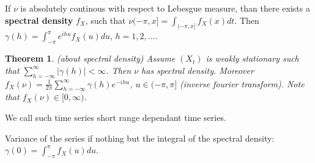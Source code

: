 \documentclass[12pt,a4paper]{amsart}
\theoremstyle{definition} %
\theoremstyle{plain} %
\newtheorem{theorem}[defn]{Theorem}
\begin{document}

If $\nu$ is absolutely continous with respect to Lebesgue measure, than there exists a {\bf spectral density} $f_X$, such that $\nu(-\pi, x] = \int_{(-\pi,x]}f_X(x) dt$. Then $\gamma(h) = \int_{-\pi}^\pi e^{i h u}f_X(u) du$, $ h = 1,2, \dots$. 

\begin{theorem} (about spectral density)
Assume $(X_t)$ is weakly stationary such that $\sum_{h =-\infty }^\infty|\gamma(h)| < \infty$. Then $\nu$ has spectral density. Moreover $f_X(\nu) = \frac{1}{2 \pi} \sum_{h = -\infty}^\infty\gamma(h) e^{-ihu}$,
$ u\in (-\pi, \pi]$ (inverse fourier transform). Note that $f_X(\nu) \in [0, \infty)$. 
\end{theorem}
We call such time series short range dependant time series. 

Variance of the series if nothing but the integral of the spectral density: $\gamma(0) = \int_{-\pi}^\pi f_X(u)du$.
\end{document}
